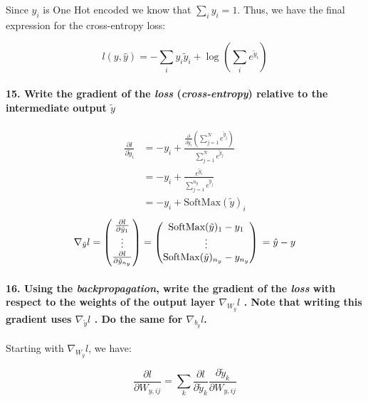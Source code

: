 \documentclass{article}
\theoremstyle{plain}%
\theoremstyle{definition}
\theoremstyle{remark}
\begin{document}
Since $y_i$ is One Hot encoded we know that $\sum_i y_i = 1$. Thus, we have the final expression for the cross-entropy loss:

$$ l(y, \hat{y}) = - \sum_{i}^{} y_i \tilde{y}_i + \log_{} \left(\sum_{i}^{} e^{\tilde{y}_i}\right) $$

\paragraph{15. Write the gradient of the \textit{loss} (\textit{cross-entropy}) relative to the intermediate output $ \tilde{y} $ }
\begin{align*}
    \frac{\partial l}{\partial \tilde{y}_i} & = -y_i + \frac{\frac{\partial }{\partial \tilde{y}_i } (\sum_{j=1}^{N} e^{ \tilde{y}_j })}{\sum_{j=1}^{N} e^{ \tilde{y}_j }} \\
                                            & = - y_i + \frac{e^{\tilde{y}_i}}{\sum_{j=1}^{n_y} e^{ \tilde{y}_j}}                                                          \\
                                            & = - y_i + \text{SoftMax}(\tilde{y})_i
\end{align*}
\[
    \nabla _{\tilde{y}}l = \begin{pmatrix}
        \frac{\partial l}{\partial \tilde{y}_1} \\
        \vdots                                  \\
        \frac{\partial l}{\partial \tilde{y}_{n_y}}
    \end{pmatrix} = \begin{pmatrix}
        \text{SoftMax}(\tilde{y})_1 - y_1 \\
        \vdots                            \\
        \text{SoftMax}(\tilde{y})_{n_y} - y_{n_y}
    \end{pmatrix} \\
    = \hat{y} - y
\]

\paragraph{16. Using the \textit{backpropagation}, write the gradient of the \textit{loss} with respect to the weights of the output layer $ \nabla _{W_y}l $ . Note that writing this gradient uses $ \nabla _{\tilde{y}}l $ . Do the same for $ \nabla _{b_y}l $.}

Starting with \( \nabla _{W_y} l \), we have:

\[
    \frac{\partial l}{\partial W_{y,ij}} = \sum_{k}^{} \frac{\partial l}{\partial \tilde{y}_k} \frac{\partial \tilde{y}_k}{\partial W_{y,ij}}
\]
\end{document}
